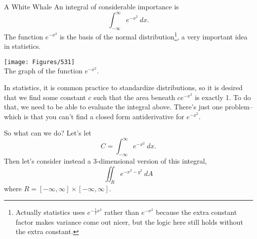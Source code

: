 \begin{exercise}{A White Whale}
An integral of considerable importance is $$\int_{-\infty}^{\infty}e^{-x^2}\ dx.$$ The function $e^{-x^2} $ is the basis of the normal distribution\footnote{Actually statistics uses $e^{-\frac{1}{2}x^2} $ rather than $e^{-x^2}$ because the extra constant factor makes variance come out nicer, but the logic here still holds without the extra constant.}, a very important idea in statistics. 

\vspace{1em}
\begin{center}
\texttt{[image: Figures/531]}\\ The graph of the function $e^{-x^2}$.
\end{center}
\vspace{1em}

In statistics, it is common practice to standardize distributions, so it is desired that we find some constant $c$ such that the area beneath $ce^{-x^2}$ is exactly 1. To do that, we need to be able to evaluate the integral above. There's just one problem-- which is that you can't find a closed form antiderivative for $e^{-x^2}$. 

\vspace{1em}

So what can we do? Let's let $$C=\int_{-\infty}^{\infty}e^{-x^2}\ dx.$$ Then let's consider instead a $3$-dimensional version of this integral, $$\iint_R e^{-x^2-y^2}\ dA $$ where $R=[-\infty,\infty]\times[-\infty,\infty].$ 


\end{exercise}
